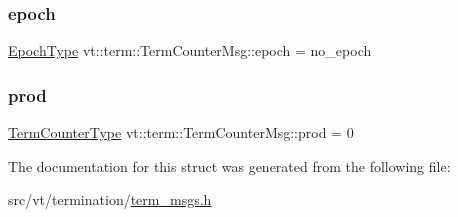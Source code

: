 \mbox{\label{structvt_1_1term_1_1_term_counter_msg_af523f9872306ba8ad1c4ad49694b3ee8}} 
\subsubsection{\texorpdfstring{epoch}{epoch}}
{\footnotesize\ttfamily \hyperlink{namespacevt_a985a5adf291c34a3ca263b3378388236}{Epoch\+Type} vt\+::term\+::\+Term\+Counter\+Msg\+::epoch = no\+\_\+epoch}

\mbox{\label{structvt_1_1term_1_1_term_counter_msg_a4fd3f09a9e5a54865abbd76a95ea7067}} 
\subsubsection{\texorpdfstring{prod}{prod}}
{\footnotesize\ttfamily \hyperlink{namespacevt_1_1term_a4fd378cdb0c36683afc1b3399d685f7f}{Term\+Counter\+Type} vt\+::term\+::\+Term\+Counter\+Msg\+::prod = 0}



The documentation for this struct was generated from the following file\+:\begin{DoxyCompactItemize}
\item 
src/vt/termination/\hyperlink{term__msgs_8h}{term\+\_\+msgs.\+h}\end{DoxyCompactItemize}

